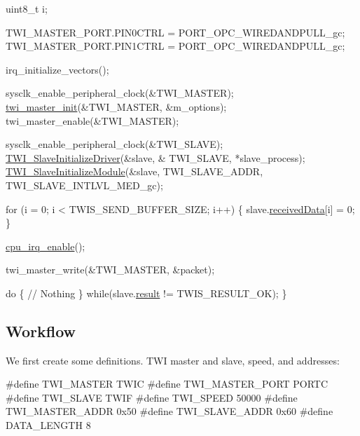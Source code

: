 \begin{DoxyCode}
             uint8\_t i;

             TWI\_MASTER\_PORT.PIN0CTRL = PORT\_OPC\_WIREDANDPULL\_gc;
             TWI\_MASTER\_PORT.PIN1CTRL = PORT\_OPC\_WIREDANDPULL\_gc;

             irq\_initialize\_vectors();

             sysclk\_enable\_peripheral\_clock(&TWI\_MASTER);
             \hyperlink{group__group__xmega__drivers__twi__twim_ga8029a07f3322bf43c289f5acb442ef29}{twi\_master\_init}(&TWI\_MASTER, &m\_options);
             twi\_master\_enable(&TWI\_MASTER);

             sysclk\_enable\_peripheral\_clock(&TWI\_SLAVE);
             \hyperlink{group__group__xmega__drivers__twi__twis_ga14b9327d32373a2481e23bec041cbd7e}{TWI\_SlaveInitializeDriver}(&slave, &
      TWI\_SLAVE, *slave\_process);
             \hyperlink{group__group__xmega__drivers__twi__twis_ga7516e604cb0aacddd8d1016a54039752}{TWI\_SlaveInitializeModule}(&slave, 
      TWI\_SLAVE\_ADDR,
                     TWI\_SLAVE\_INTLVL\_MED\_gc);

             \textcolor{keywordflow}{for} (i = 0; i < TWIS\_SEND\_BUFFER\_SIZE; i++) \{
                 slave.\hyperlink{struct_t_w_i___slave_a8c205728fdea8bcaeaa0f6f889d83d4d}{receivedData}[i] = 0;
             \}

             \hyperlink{group__interrupt__group_gae4922a4bd8ba4150211fbc7f2302403c}{cpu\_irq\_enable}();

             twi\_master\_write(&TWI\_MASTER, &packet);

             \textcolor{keywordflow}{do} \{
                 \textcolor{comment}{// Nothing}
             \} \textcolor{keywordflow}{while}(slave.\hyperlink{struct_t_w_i___slave_a38f52b1274d890275ae25f68d289c8d8}{result} != TWIS\_RESULT\_OK);
         \}
\end{DoxyCode}
\hypertarget{xmega_twi_quickstart_xmega_twi_quickstart_use_case_workflow}{}\subsection{Workflow}\label{xmega_twi_quickstart_xmega_twi_quickstart_use_case_workflow}
We first create some definitions. T\-W\-I master and slave, speed, and addresses\-: 
\begin{DoxyCode}
\textcolor{preprocessor}{         #define TWI\_MASTER       TWIC}
\textcolor{preprocessor}{}\textcolor{preprocessor}{         #define TWI\_MASTER\_PORT  PORTC}
\textcolor{preprocessor}{}\textcolor{preprocessor}{         #define TWI\_SLAVE        TWIF}
\textcolor{preprocessor}{}\textcolor{preprocessor}{         #define TWI\_SPEED        50000}
\textcolor{preprocessor}{}\textcolor{preprocessor}{         #define TWI\_MASTER\_ADDR  0x50}
\textcolor{preprocessor}{}\textcolor{preprocessor}{         #define TWI\_SLAVE\_ADDR   0x60}
\textcolor{preprocessor}{}
\textcolor{preprocessor}{         #define DATA\_LENGTH     8}
\end{DoxyCode}


